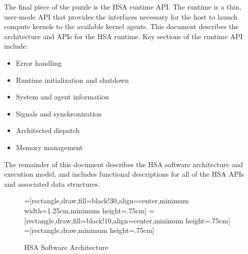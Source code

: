 \documentclass[oneside]{book}
\begin{document}
The final piece of the puzzle is the HSA runtime API.  The runtime is a thin,
user-mode API that provides the interfaces necessary for the host to launch
compute kernels to the available kernel agents. This document describes the
architecture and APIs for the HSA runtime. Key sections of the runtime API
include:
\begin{itemize}[itemsep=0pt,topsep=0pt,partopsep=0pt]
\item Error handling
\item Runtime initialization and shutdown
\item System and agent information
\item Signals and synchronization
\item Architected dispatch
\item Memory management
\end{itemize}

The remainder of this document describes the HSA software architecture and
execution model, and includes functional descriptions for all of the HSA APIs
and associated data structures.

\begin{figure}[t]
  \centering
  =[rectangle,draw,fill=black!30,align=center,minimum width=1.25cm,minimum height=.75cm]
  =[rectangle,draw,fill=black!10,align=center,minimum height=.75cm]
  =[rectangle,draw,minimum height=.75cm]
  \caption{HSA Software Architecture}
  \label{fig:swarch}
\end{figure}
\end{document}
